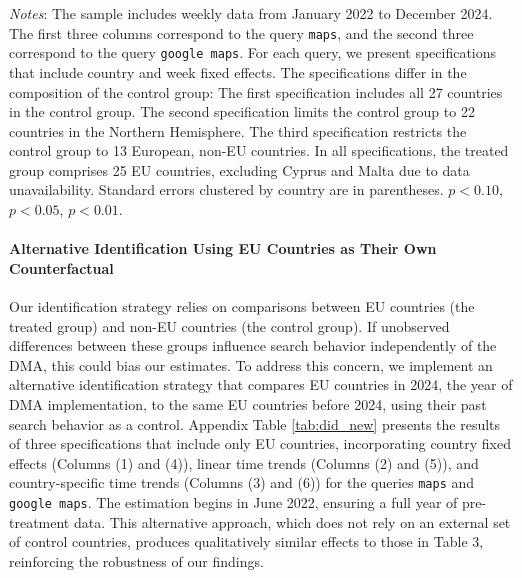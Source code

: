 \documentclass[11pt]{article}
\begin{document}
\begin{table}[!ht]
\begin{threeparttable}
			\begin{tablenotes}
				\item \footnotesize \emph{Notes}: The sample includes weekly data from January 2022 to December 2024. The first three columns correspond to the query \texttt{maps}, and the second three correspond to the query \texttt{google maps}. For each query, we present specifications that include country and week fixed effects. The specifications differ in the composition of the control group: The first specification includes all 27 countries in the control group. The second specification limits the control group to 22 countries in the Northern Hemisphere. The third specification restricts the control group to 13 European, non-EU countries. In all specifications, the treated group comprises 25 EU countries, excluding Cyprus and Malta due to data unavailability. Standard errors clustered by country are in parentheses. \sym{*} \(p<0.10\), \sym{**} \(p<0.05\), \sym{***}  \(p<0.01\). 
			\end{tablenotes}
		\end{threeparttable}
	\end{table}
	
	
	\clearpage
	
	
	\paragraph{Alternative Identification Using EU Countries as Their Own Counterfactual} Our identification strategy relies on comparisons between EU countries (the treated group) and non-EU countries (the control group). If unobserved differences between these groups influence search behavior independently of the DMA, this could bias our estimates. To address this concern, we implement an alternative identification strategy that compares EU countries in 2024, the year of DMA implementation, to the same EU countries before 2024, using their past search behavior as a control. Appendix Table \ref{tab:did_new} presents the results of three specifications that include only EU countries, incorporating country fixed effects (Columns (1) and (4)), linear time trends (Columns (2) and (5)), and country-specific time trends (Columns (3) and (6)) for the queries \texttt{maps} and \texttt{google maps}. The estimation begins in June 2022, ensuring a full year of pre-treatment data. This alternative approach, which does not rely on an external set of control countries, produces qualitatively similar effects to those in Table 3, reinforcing the robustness of our findings.
	
\end{document}

